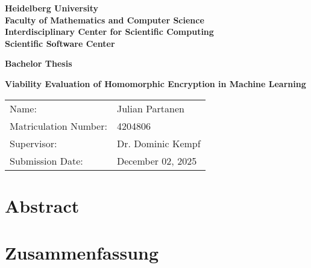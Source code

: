 \documentclass[
     12pt,         %
     a4paper,      %
     BCOR=10mm,     %
     DIV=14,        %
     liststotoc,   %
     bibtotoc,     %
     parskip=half,       %
     openright
     ]{scrreprt}
\begin{document}
\begin{titlepage}


\vspace*{1cm}
\begin{center}
\vspace*{3cm}
\textbf{
\Large Heidelberg University\\
\smallskip
\Large Faculty of Mathematics and Computer Science\\
\smallskip
\Large Interdisciplinary Center for Scientific Computing\\
\smallskip
\Large Scientific Software Center\\
\smallskip
}

\vspace{3cm}

\textbf{\large Bachelor Thesis}

\vspace{0.5\baselineskip}
{\huge
\textbf{Viability Evaluation of Homomorphic Encryption in Machine Learning}
}
\end{center}

\vfill

{\large
\begin{tabular}[l]{ll}
Name: & Julian Partanen\\
Matriculation Number: & 4204806\\
Supervisor: & Dr. Dominic Kempf\\
Submission Date: & December 02, 2025
\end{tabular}
}

\end{titlepage}

\chapter*{Abstract}

\newpage

\chapter*{Zusammenfassung}

\newpage

\tableofcontents
\cleardoublepage
{}

\end{document}
